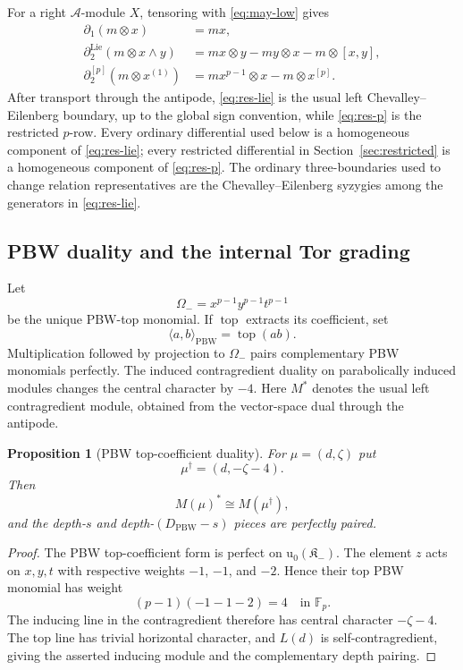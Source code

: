\documentclass[11pt]{article}
\theoremstyle{plain}
\newtheorem{proposition}[proposition]{Proposition}
\theoremstyle{definition}
\theoremstyle{remark}
\numberwithin{equation}{section}
\newcommand{\Kalg}{\mathfrak K}
\newcommand{\uenv}{\mathrm u}
\begin{document}
For a right $\mathcal A$-module $X$, tensoring with \eqref{eq:may-low} gives
\begin{align}
 \partial_1(m\otimes x)&=mx,\label{eq:res-d1}\\
 \partial_2^{\mathrm{Lie}}(m\otimes x\wedge y)
 &=mx\otimes y-my\otimes x-m\otimes[x,y],\label{eq:res-lie}\\
 \partial_2^{[p]}(m\otimes x^{(1)})
 &=mx^{p-1}\otimes x-m\otimes x^{[p]}.\label{eq:res-p}
\end{align}
After transport through the antipode, \eqref{eq:res-lie} is the usual left
Chevalley--Eilenberg boundary, up to the global sign convention, while
\eqref{eq:res-p} is the restricted $p$-row.  Every ordinary differential used below is a
homogeneous component of \eqref{eq:res-lie}; every restricted differential in
Section~\ref{sec:restricted} is a homogeneous component of \eqref{eq:res-p}.  The ordinary three-boundaries used to change relation representatives are the
Chevalley--Eilenberg syzygies among the generators in \eqref{eq:res-lie}.

\subsection{PBW duality and the internal Tor grading}\label{sec:pbw}

Let
\[
 \Omega_-=x^{p-1}y^{p-1}t^{p-1}
\]
be the unique PBW-top monomial.  If $\operatorname{top}$ extracts its coefficient, set
\[
 \langle a,b\rangle_{\mathrm{PBW}}=\operatorname{top}(ab).
\]
Multiplication followed by projection to $\Omega_-$ pairs complementary PBW monomials
perfectly.  The induced contragredient duality on parabolically induced modules changes the central character by
$-4$.  Here $M^*$ denotes the usual left contragredient module, obtained from the
vector-space dual through the antipode.

\begin{proposition}[PBW top-coefficient duality]\label{prop:PBW-dual}
For $\mu=(d,\zeta)$ put
\[
 \mu^\dagger=(d,-\zeta-4).
\]
Then
\[
 M(\mu)^*\cong M(\mu^\dagger),
\]
and the depth-$s$ and depth-$(D_{\mathrm{PBW}}-s)$ pieces are perfectly paired.
\end{proposition}

\begin{proof}
The PBW top-coefficient form is perfect on $\uenv_0(\Kalg_-)$.
The element $z$ acts on $x,y,t$ with respective weights
$-1$, $-1$, and $-2$.
Hence their top PBW monomial has weight
\[ (p-1)(-1-1-2)=4\quad\text{in }\mathbb F_p .\]
The inducing line in the contragredient therefore has central
character $-\zeta-4$. The top line has trivial horizontal character,
and $L(d)$ is self-contragredient, giving the asserted inducing
module and the complementary depth pairing.
\end{proof}
\end{document}
